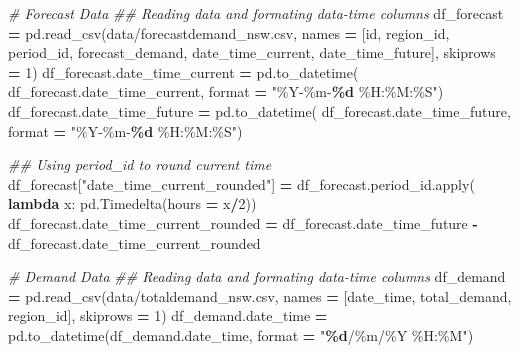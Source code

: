 \documentclass[mstat,12pt]{unswthesis}
\newenvironment{Shaded}{\begin{snugshade}}{\end{snugshade}}
\newcommand{\BuiltInTok}[1]{#1}
\newcommand{\CommentTok}[1]{\textcolor[rgb]{0.56,0.35,0.01}{\textit{#1}}}
\newcommand{\DecValTok}[1]{\textcolor[rgb]{0.00,0.00,0.81}{#1}}
\newcommand{\KeywordTok}[1]{\textcolor[rgb]{0.13,0.29,0.53}{\textbf{#1}}}
\newcommand{\NormalTok}[1]{#1}
\newcommand{\OperatorTok}[1]{\textcolor[rgb]{0.81,0.36,0.00}{\textbf{#1}}}
\newcommand{\SpecialCharTok}[1]{\textcolor[rgb]{0.81,0.36,0.00}{\textbf{#1}}}
\newcommand{\StringTok}[1]{\textcolor[rgb]{0.31,0.60,0.02}{#1}}
\begin{document}
\begin{Shaded}
\begin{Highlighting}[]
\CommentTok{\# Forecast Data}
\CommentTok{\#\# Reading data and formating data{-}time columns}
\NormalTok{df\_forecast }\OperatorTok{=}\NormalTok{ pd.read\_csv(}\StringTok{\textquotesingle{}data/forecastdemand\_nsw.csv\textquotesingle{}}\NormalTok{, names }\OperatorTok{=} 
\NormalTok{    [}\StringTok{\textquotesingle{}id\textquotesingle{}}\NormalTok{, }\StringTok{\textquotesingle{}region\_id\textquotesingle{}}\NormalTok{, }\StringTok{\textquotesingle{}period\_id\textquotesingle{}}\NormalTok{, }\StringTok{\textquotesingle{}forecast\_demand\textquotesingle{}}\NormalTok{, }
    \StringTok{\textquotesingle{}date\_time\_current\textquotesingle{}}\NormalTok{, }\StringTok{\textquotesingle{}date\_time\_future\textquotesingle{}}\NormalTok{], skiprows }\OperatorTok{=} \DecValTok{1}\NormalTok{)}
\NormalTok{df\_forecast.date\_time\_current }\OperatorTok{=}\NormalTok{ pd.to\_datetime(}
\NormalTok{    df\_forecast.date\_time\_current, }\BuiltInTok{format} \OperatorTok{=} \StringTok{"\%Y{-}\%m{-}}\SpecialCharTok{\%d}\StringTok{ \%H:\%M:\%S"}\NormalTok{)}
\NormalTok{df\_forecast.date\_time\_future }\OperatorTok{=}\NormalTok{ pd.to\_datetime(}
\NormalTok{    df\_forecast.date\_time\_future, }\BuiltInTok{format} \OperatorTok{=} \StringTok{"\%Y{-}\%m{-}}\SpecialCharTok{\%d}\StringTok{ \%H:\%M:\%S"}\NormalTok{)}

\CommentTok{\#\# Using \textquotesingle{}period\_id\textquotesingle{} to round \textquotesingle{}current time\textquotesingle{}}
\NormalTok{df\_forecast[}\StringTok{"date\_time\_current\_rounded"}\NormalTok{] }\OperatorTok{=}\NormalTok{ df\_forecast.period\_id.}\BuiltInTok{apply}\NormalTok{(}
    \KeywordTok{lambda}\NormalTok{ x: pd.Timedelta(hours }\OperatorTok{=}\NormalTok{ x}\OperatorTok{/}\DecValTok{2}\NormalTok{))}
\NormalTok{df\_forecast.date\_time\_current\_rounded }\OperatorTok{=}\NormalTok{ df\_forecast.date\_time\_future }\OperatorTok{{-}}
\NormalTok{    df\_forecast.date\_time\_current\_rounded}

\CommentTok{\# Demand Data}
\CommentTok{\#\# Reading data and formating data{-}time columns}
\NormalTok{df\_demand }\OperatorTok{=}\NormalTok{ pd.read\_csv(}\StringTok{\textquotesingle{}data/totaldemand\_nsw.csv\textquotesingle{}}\NormalTok{, names }\OperatorTok{=} 
\NormalTok{    [}\StringTok{\textquotesingle{}date\_time\textquotesingle{}}\NormalTok{, }\StringTok{\textquotesingle{}total\_demand\textquotesingle{}}\NormalTok{, }\StringTok{\textquotesingle{}region\_id\textquotesingle{}}\NormalTok{], skiprows }\OperatorTok{=} \DecValTok{1}\NormalTok{)}
\NormalTok{df\_demand.date\_time }\OperatorTok{=}\NormalTok{ pd.to\_datetime(df\_demand.date\_time, }
    \BuiltInTok{format} \OperatorTok{=} \StringTok{"}\SpecialCharTok{\%d}\StringTok{/\%m/\%Y \%H:\%M"}\NormalTok{)}



\end{Highlighting}
\end{Shaded}
\end{document}
